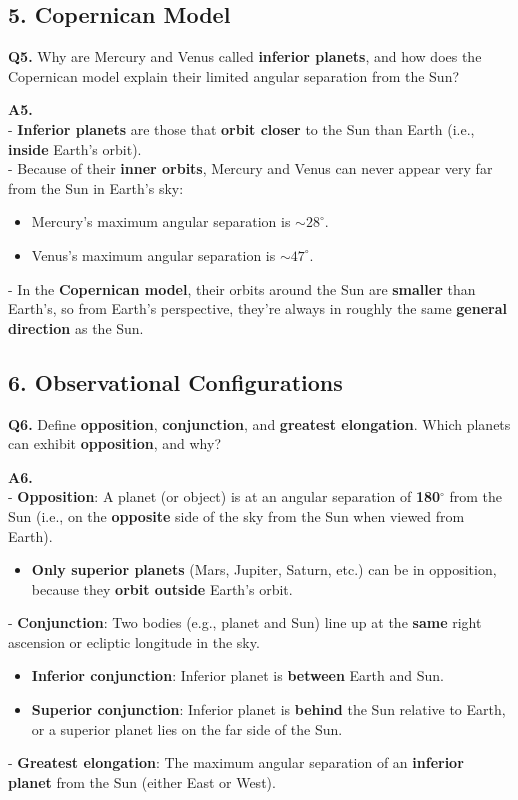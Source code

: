 \subsection*{5. Copernican Model}

\textbf{Q5.} Why are Mercury and Venus called \textbf{inferior planets}, and how does the Copernican model explain their limited angular separation from the Sun?

\textbf{A5.}\\
- \textbf{Inferior planets} are those that \textbf{orbit closer} to the Sun than Earth (i.e., \textbf{inside} Earth’s orbit).\\
- Because of their \textbf{inner orbits}, Mercury and Venus can never appear very far from the Sun in Earth’s sky:
  \begin{itemize}
    \item Mercury’s maximum angular separation is $\sim 28^\circ$.
    \item Venus’s maximum angular separation is $\sim 47^\circ$.
  \end{itemize}
- In the \textbf{Copernican model}, their orbits around the Sun are \textbf{smaller} than Earth’s, so from Earth’s perspective, they’re always in roughly the same \textbf{general direction} as the Sun.

\subsection*{6. Observational Configurations}

\textbf{Q6.} Define \textbf{opposition}, \textbf{conjunction}, and \textbf{greatest elongation}. Which planets can exhibit \textbf{opposition}, and why?

\textbf{A6.}\\
- \textbf{Opposition}: A planet (or object) is at an angular separation of \textbf{180$^\circ$} from the Sun (i.e., on the \textbf{opposite} side of the sky from the Sun when viewed from Earth).
  \begin{itemize}
    \item \textbf{Only superior planets} (Mars, Jupiter, Saturn, etc.) can be in opposition, because they \textbf{orbit outside} Earth’s orbit.
  \end{itemize}
- \textbf{Conjunction}: Two bodies (e.g., planet and Sun) line up at the \textbf{same} right ascension or ecliptic longitude in the sky.
  \begin{itemize}
    \item \textbf{Inferior conjunction}: Inferior planet is \textbf{between} Earth and Sun.
    \item \textbf{Superior conjunction}: Inferior planet is \textbf{behind} the Sun relative to Earth, or a superior planet lies on the far side of the Sun.
  \end{itemize}
- \textbf{Greatest elongation}: The maximum angular separation of an \textbf{inferior planet} from the Sun (either East or West).

